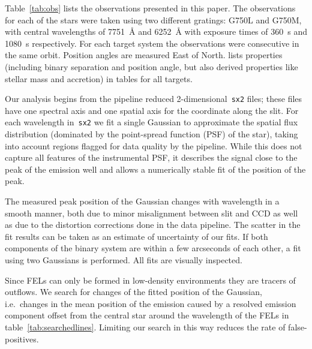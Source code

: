\documentclass[twocolumn]{aastex62}
\begin{document}
Table~\ref{tab:obs} lists the observations presented in this paper. The
observations for each of the stars were taken using two different gratings:
G750L and G750M, with central wavelengths of 7751~\AA{} and 6252~\AA{} with
exposure times of 360~s and 1080~s respectively. For each target system the observations were consecutive in the same orbit. Position angles are measured East of North. \citet{2003ApJ...583..334H} lists properties (including binary separation and position angle, but also derived properties like stellar mass and accretion) in tables for all targets.

Our analysis begins from the pipeline reduced
2-dimensional~\texttt{sx2} files; these files have one spectral axis and
one spatial axis for the coordinate along the slit. For each wavelength
in~\texttt{sx2} we fit a single Gaussian to approximate the spatial flux distribution (dominated by the point-spread function (PSF) of the star), taking into account regions
flagged for data quality by the pipeline. While this does not capture
all features of the instrumental PSF, it describes the signal close to the
peak of the emission well and allows a numerically stable fit of the
position of the peak.

The measured peak position  of the Gaussian changes with
wavelength in a smooth manner, both due to minor misalignment between slit and CCD as well as due to the distortion corrections done in the data
pipeline. The scatter in the fit results can be
taken as an estimate of uncertainty of our fits.
If both components of the binary system are within a few arcseconds of
each other, a fit using two Gaussians is performed. All fits are
visually inspected. 

Since FELs can only be formed in low-density
environments they are tracers of outflows. We search for changes
of the fitted position of the Gaussian, i.e.\ changes in the mean
position of the emission caused by a resolved emission component offset from
the central star around the wavelength of the FELs in table~\ref{tab:searchedlines}. Limiting our search in this way reduces the
rate of false-positives. 



\end{document}
